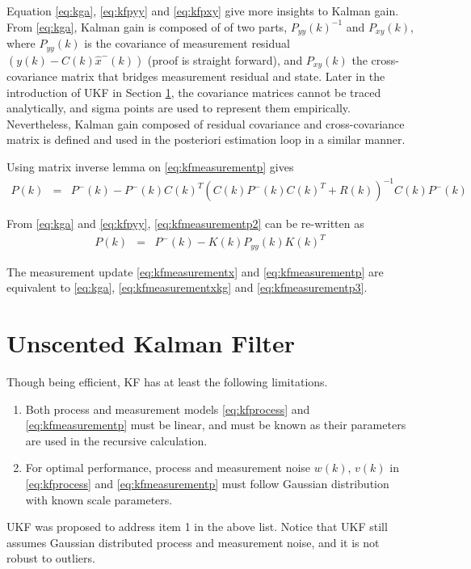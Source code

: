 Equation \eqref{eq:kga}, \eqref{eq:kfpyy} and \eqref{eq:kfpxy} give more insights to Kalman gain. From \eqref{eq:kga}, Kalman gain is composed of of two parts,  $P_{yy}(k)^{-1}$ and $P_{xy}(k)$, where $P_{yy}(k)$ is the covariance of measurement residual $\left(y(k)-C(k)\hat{x}^-(k)\right)$ (proof is straight forward), and $P_{xy}(k)$ the cross-covariance matrix that bridges measurement residual and state. Later in the introduction of UKF in Section \ref{sec:ukf}, the covariance matrices cannot be traced analytically, and sigma points are used to represent them empirically. Nevertheless, Kalman gain composed of residual covariance and cross-covariance matrix is defined and used in the posteriori estimation loop in a similar manner.

Using matrix inverse lemma on \eqref{eq:kfmeasurementp} gives
\begin{eqnarray}
	P(k) &=& P^-(k) - P^-(k)C(k)^T\left(C(k)P^-(k)C(k)^T + R(k)\right)^{-1}C(k)P^-(k) \label{eq:kfmeasurementp2}
\end{eqnarray}

From \eqref{eq:kga} and \eqref{eq:kfpyy}, \eqref{eq:kfmeasurementp2} can be re-written as
\begin{eqnarray}
	P(k) &=& P^-(k) - K(k)P_{yy}(k)K(k)^T \label{eq:kfmeasurementp3}
\end{eqnarray}

The measurement update \eqref{eq:kfmeasurementx} and \eqref{eq:kfmeasurementp} are equivalent to \eqref{eq:kga}, \eqref{eq:kfmeasurementxkg} and \eqref{eq:kfmeasurementp3}.

\section{Unscented Kalman Filter} \label{sec:ukf}

Though being efficient, KF has at least the following limitations.
\begin{enumerate}
	\item Both process and measurement models \eqref{eq:kfprocess} and \eqref{eq:kfmeasurementp} must be linear, and must be known as their parameters are used in the recursive calculation.
	\item For optimal performance, process and measurement noise $w(k)$, $v(k)$ in \eqref{eq:kfprocess} and \eqref{eq:kfmeasurementp} must follow Gaussian distribution with known scale parameters. 
\end{enumerate}

UKF was proposed to address item 1 in the above list. Notice that UKF still assumes Gaussian distributed process and measurement noise, and it is not robust to outliers.

